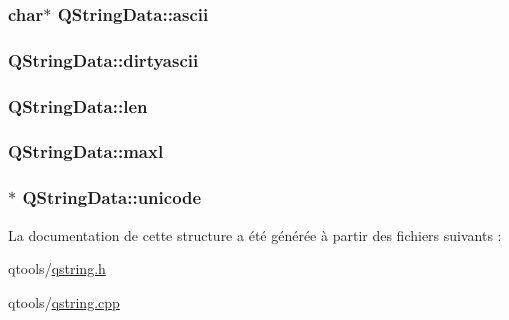 \subsubsection[{ascii}]{\setlength{\rightskip}{0pt plus 5cm}char$\ast$ Q\+String\+Data\+::ascii}\label{struct_q_string_data_abfc6719543722e9e8b6dee0cafdc506c}
\hypertarget{struct_q_string_data_ab8a58a2bd4e619f151e59aff14c75d54}{}
\subsubsection[{dirtyascii}]{ Q\+String\+Data\+::dirtyascii}\label{struct_q_string_data_ab8a58a2bd4e619f151e59aff14c75d54}
\hypertarget{struct_q_string_data_a53835c385536b0285210dce78c256568}{}
\subsubsection[{len}]{ Q\+String\+Data\+::len}\label{struct_q_string_data_a53835c385536b0285210dce78c256568}
\hypertarget{struct_q_string_data_ae8b44ff3a52935f9460fdaacaa92fd4e}{}
\subsubsection[{maxl}]{ Q\+String\+Data\+::maxl}\label{struct_q_string_data_ae8b44ff3a52935f9460fdaacaa92fd4e}
\hypertarget{struct_q_string_data_ad7797dad5e9a1a63a3f21025f32331d0}{}
\subsubsection[{unicode}]{$\ast$ Q\+String\+Data\+::unicode}\label{struct_q_string_data_ad7797dad5e9a1a63a3f21025f32331d0}


La documentation de cette structure a été générée à partir des fichiers suivants \+:\begin{DoxyCompactItemize}
\item 
qtools/\hyperlink{qstring_8h}{qstring.\+h}\item 
qtools/\hyperlink{qstring_8cpp}{qstring.\+cpp}\end{DoxyCompactItemize}
